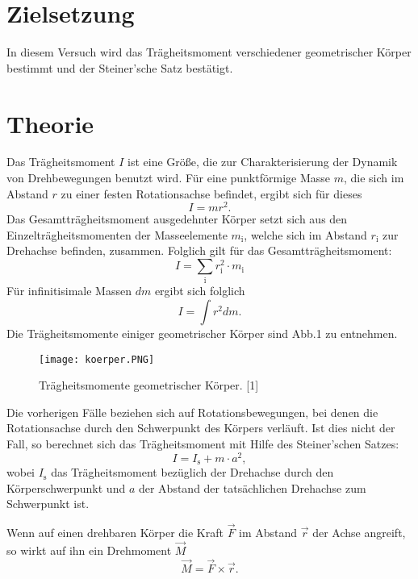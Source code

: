 \section{Zielsetzung}
\label{sec:Zielsetzung}
In diesem Versuch wird das Trägheitsmoment verschiedener
geometrischer Körper bestimmt und der Steiner'sche Satz bestätigt.


\section{Theorie}
\label{sec:Theorie}

Das Trägheitsmoment $I$ ist eine Größe, die zur Charakterisierung
der Dynamik von Drehbewegungen benutzt wird. Für eine
punktförmige Masse $m$, die sich im Abstand $r$ zu einer festen
Rotationsachse befindet, ergibt sich für dieses
\begin{equation}
I = mr^2.
\end{equation}
Das Gesamtträgheitsmoment ausgedehnter Körper setzt sich aus den
Einzelträgheitsmomenten der Masseelemente $m_{\text{i}}$,
welche sich im Abstand $r_{\text{i}}$ zur Drehachse befinden,
zusammen. Folglich gilt für das Gesamtträgheitsmoment:
\begin{equation}
I = \sum_{\text{i}} r_{\text{i}}^2 \cdot m_{\text{i}}
\end{equation}
Für infinitisimale Massen $dm$ ergibt sich folglich
\begin{equation}
I = \int r^2 dm.
\end{equation}
Die Trägheitsmomente einiger geometrischer Körper sind Abb.1 zu
entnehmen.
\begin{figure}
\centering
\caption{Trägheitsmomente geometrischer Körper. [1]}
\texttt{[image: koerper.PNG]}
\label{fig:koerper}
\end{figure}
Die vorherigen Fälle beziehen sich auf Rotationsbewegungen,
bei denen die Rotationsachse durch den Schwerpunkt des
Körpers verläuft. Ist dies nicht der Fall, so berechnet sich
das Trägheitsmoment mit Hilfe des Steiner'schen Satzes:
\begin{equation*}
I = I_{\text{s}} + m \cdot a^2,
\end{equation*}
wobei $I_{\text{s}}$ das Trägheitsmoment bezüglich der
Drehachse durch den Körperschwerpunkt und $a$ der Abstand der
tatsächlichen Drehachse zum Schwerpunkt ist.
\par
Wenn auf einen drehbaren Körper die Kraft $\vec{F}$ im Abstand
$\vec{r}$ der Achse angreift, so wirkt auf ihn ein Drehmoment
$\vec{M}$
\begin{equation}
\vec{M} = \vec{F} \times \vec{r}.
\end{equation}
